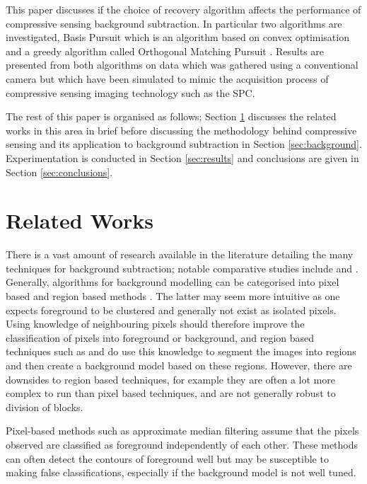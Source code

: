 This paper discusses if the choice of recovery algorithm affects the performance of compressive sensing background subtraction. In particular two algorithms are investigated, Basis Pursuit \cite{Candes2005} which is an algorithm based on convex optimisation \cite{boyd2004convex} and a greedy algorithm called Orthogonal Matching Pursuit \cite{tropp2004}. Results are presented from both algorithms on data which was gathered using a conventional camera but which have been simulated to mimic the acquisition process of compressive sensing imaging technology such as the SPC. 

The rest of this paper is organised as follows; Section \ref{sec:related-works} discusses the related works in this area in brief before discussing the methodology behind compressive sensing and its application to background subtraction in Section \ref{sec:background}. Experimentation is conducted in Section \ref{sec:results} and conclusions are given in Section \ref{sec:conclusions}. 


\section{Related Works}
\label{sec:related-works}

There is a vast amount of research available  in the literature detailing the many techniques for background subtraction; notable comparative studies include \cite{Sen-Ching2004} and \cite{Piccardi2004a}. Generally, algorithms for background modelling  can be categorised into pixel based and region based methods  \cite{Bouwmans2011}. The latter may seem more intuitive as one expects foreground to be clustered and generally not exist as isolated pixels. Using knowledge of neighbouring pixels should therefore improve the classification of pixels into foreground or background, and region based techniques such as  \cite{elgammal2000} and \cite{toyama1999} do use this knowledge to segment the images into regions and then create a background model based on these regions. However, there are downsides to region based techniques, for example they are often a lot more complex to run than pixel based techniques, and are not generally robust to division of blocks.

Pixel-based methods such as approximate median filtering \cite{McFarlane1995} assume that the pixels observed are classified as foreground independently of each other. These methods can often detect the contours of foreground well but may be susceptible to making false classifications, especially if the background model is not well tuned.  


